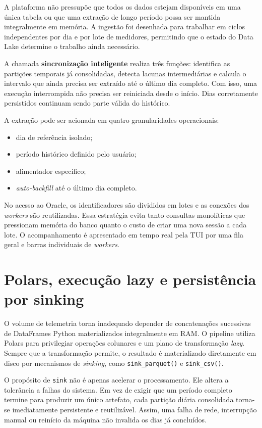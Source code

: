 A plataforma não pressupõe que todos os dados estejam disponíveis em uma única tabela ou que uma extração de longo período possa ser mantida integralmente em memória. A ingestão foi desenhada para trabalhar em ciclos independentes por dia e por lote de medidores, permitindo que o estado do Data Lake determine o trabalho ainda necessário.

A chamada \textbf{sincronização inteligente} realiza três funções: identifica as partições temporais já consolidadas, detecta lacunas intermediárias e calcula o intervalo que ainda precisa ser extraído até o último dia completo. Com isso, uma execução interrompida não precisa ser reiniciada desde o início. Dias corretamente persistidos continuam sendo parte válida do histórico.

A extração pode ser acionada em quatro granularidades operacionais:

\begin{itemize}
\item
  dia de referência isolado;
\item
  período histórico definido pelo usuário;
\item
  alimentador específico;
\item
  \emph{auto-backfill} até o último dia completo.
\end{itemize}

No acesso ao Oracle, os identificadores são divididos em lotes e as conexões dos \emph{workers} são reutilizadas. Essa estratégia evita tanto consultas monolíticas que pressionam memória do banco quanto o custo de criar uma nova sessão a cada lote. O acompanhamento é apresentado em tempo real pela TUI por uma fila geral e barras individuais de \emph{workers}.

\section{Polars, execução lazy e persistência por sinking}\label{polars-execuuxe7uxe3o-lazy-e-persistuxeancia-por-sinking}

O volume de telemetria torna inadequado depender de concatenações sucessivas de DataFrames Python materializados integralmente em RAM. O pipeline utiliza Polars para privilegiar operações colunares e um plano de transformação \emph{lazy}. Sempre que a transformação permite, o resultado é materializado diretamente em disco por mecanismos de \emph{sinking}, como \texttt{sink\_parquet()} e \texttt{sink\_csv()}.

O propósito de \texttt{sink} não é apenas acelerar o processamento. Ele altera a tolerância a falhas do sistema. Em vez de exigir que um período completo termine para produzir um único artefato, cada partição diária consolidada torna-se imediatamente persistente e reutilizável. Assim, uma falha de rede, interrupção manual ou reinício da máquina não invalida os dias já concluídos.

